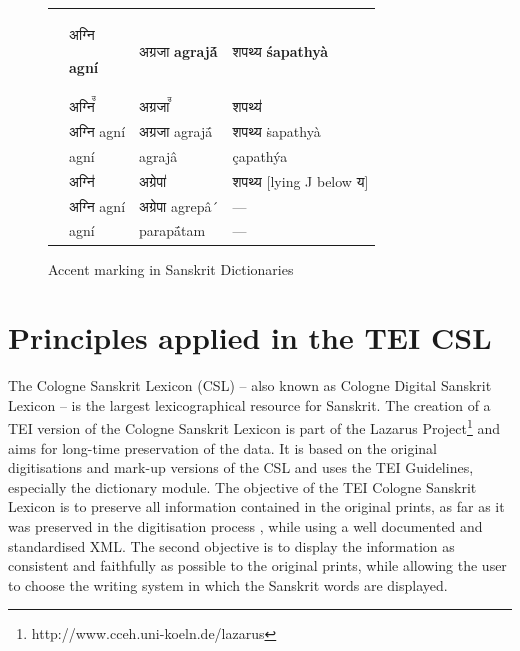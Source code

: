 \begin{figure}[!ht]
\begin{center}
\begingroup
\setlength{\tabcolsep}{10pt} %
\renewcommand{\arraystretch}{1.5} %
\begin{tabular}{llll}
  & \begin{devbfont}अग्नि\end{devbfont} {\bf agní}& {\devbfont अग्रजा} {\bf agrajā́} & {\devbfont शपथ्य} {\bf śapathyà}\\
 \citet{pwg} & {\devfont अग्नि꣫} & {\devfont अग्रजा꣫} & {\devfont शपथ्य॑}\\
 \citet{mw} & {\devfont अग्नि} agní & {\devfont अग्रजा} agrajā́ & {\devfont शपथ्य} ṡapathyà \\
 \citet{gra} & agní & agrajâ & çapathýa \\
 \citet{ccs,cae}  & {\devfont अग्नि॑} & {\devfont अग्रेपा॑} & {\devfont शपथ्य} {\scriptsize[lying J below {\devfont य}]}\\
\citet{md}  & {\devfont अग्नि} agní & {\devfont अग्रेपा} agrepâ´ & — \\
\citet{sch} & agní & parapā́tam & —
\end{tabular}
\endgroup
\end{center}
\caption[Accent marking in Sanskrit Dictionaries]{\label{tab:summary}Accent marking in Sanskrit Dictionaries}
\end{figure}

\chapter{Principles applied in the TEI CSL}

The Cologne Sanskrit Lexicon (CSL)\citep{markingMonier,KappMalten1997} – also known as Cologne Digital Sanskrit Lexicon – is the largest lexicographical resource for Sanskrit. The creation of a TEI version of the Cologne Sanskrit Lexicon is part of the Lazarus Project\footnote{http://www.cceh.uni-koeln.de/lazarus} and aims for long-time preservation of the data. It is based on the original digitisations and mark-up versions of the CSL and uses the TEI Guidelines, especially the dictionary module. The objective of the TEI Cologne Sanskrit Lexicon is to preserve all information contained in the original prints, as far as it was preserved in the digitisation process \citep[][as described in]{KappMalten1997}, while using a well documented and standardised XML. The second objective is to display the information as consistent and faithfully as possible to the original prints, while allowing the user to choose the writing system in which the Sanskrit words are displayed.

